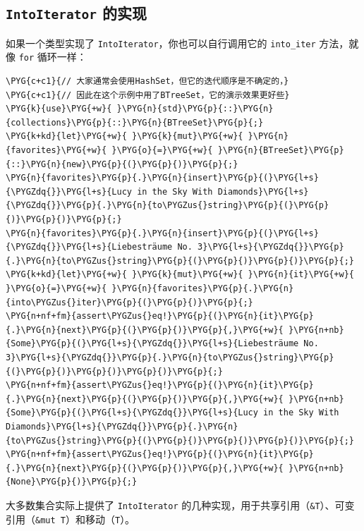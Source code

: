 \subsection{\texttt{IntoIterator} 的实现}

如果一个类型实现了 \texttt{IntoIterator}，你也可以自行调用它的 \texttt{into\_iter} 方法，就像 \texttt{for} 循环一样：

\begin{Verbatim}[commandchars=\\\{\},breaklines=true,breakanywhere=true,fontsize=\codefont,xleftmargin=17bp]
\PYG{c+c1}{// 大家通常会使用HashSet，但它的迭代顺序是不确定的，}
\PYG{c+c1}{// 因此在这个示例中用了BTreeSet，它的演示效果更好些}
\PYG{k}{use}\PYG{+w}{ }\PYG{n}{std}\PYG{p}{::}\PYG{n}{collections}\PYG{p}{::}\PYG{n}{BTreeSet}\PYG{p}{;}
\PYG{k+kd}{let}\PYG{+w}{ }\PYG{k}{mut}\PYG{+w}{ }\PYG{n}{favorites}\PYG{+w}{ }\PYG{o}{=}\PYG{+w}{ }\PYG{n}{BTreeSet}\PYG{p}{::}\PYG{n}{new}\PYG{p}{(}\PYG{p}{)}\PYG{p}{;}
\PYG{n}{favorites}\PYG{p}{.}\PYG{n}{insert}\PYG{p}{(}\PYG{l+s}{\PYGZdq{}}\PYG{l+s}{Lucy in the Sky With Diamonds}\PYG{l+s}{\PYGZdq{}}\PYG{p}{.}\PYG{n}{to\PYGZus{}string}\PYG{p}{(}\PYG{p}{)}\PYG{p}{)}\PYG{p}{;}
\PYG{n}{favorites}\PYG{p}{.}\PYG{n}{insert}\PYG{p}{(}\PYG{l+s}{\PYGZdq{}}\PYG{l+s}{Liebesträume No. 3}\PYG{l+s}{\PYGZdq{}}\PYG{p}{.}\PYG{n}{to\PYGZus{}string}\PYG{p}{(}\PYG{p}{)}\PYG{p}{)}\PYG{p}{;}
\PYG{k+kd}{let}\PYG{+w}{ }\PYG{k}{mut}\PYG{+w}{ }\PYG{n}{it}\PYG{+w}{ }\PYG{o}{=}\PYG{+w}{ }\PYG{n}{favorites}\PYG{p}{.}\PYG{n}{into\PYGZus{}iter}\PYG{p}{(}\PYG{p}{)}\PYG{p}{;}
\PYG{n+nf+fm}{assert\PYGZus{}eq!}\PYG{p}{(}\PYG{n}{it}\PYG{p}{.}\PYG{n}{next}\PYG{p}{(}\PYG{p}{)}\PYG{p}{,}\PYG{+w}{ }\PYG{n+nb}{Some}\PYG{p}{(}\PYG{l+s}{\PYGZdq{}}\PYG{l+s}{Liebesträume No. 3}\PYG{l+s}{\PYGZdq{}}\PYG{p}{.}\PYG{n}{to\PYGZus{}string}\PYG{p}{(}\PYG{p}{)}\PYG{p}{)}\PYG{p}{)}\PYG{p}{;}
\PYG{n+nf+fm}{assert\PYGZus{}eq!}\PYG{p}{(}\PYG{n}{it}\PYG{p}{.}\PYG{n}{next}\PYG{p}{(}\PYG{p}{)}\PYG{p}{,}\PYG{+w}{ }\PYG{n+nb}{Some}\PYG{p}{(}\PYG{l+s}{\PYGZdq{}}\PYG{l+s}{Lucy in the Sky With Diamonds}\PYG{l+s}{\PYGZdq{}}\PYG{p}{.}\PYG{n}{to\PYGZus{}string}\PYG{p}{(}\PYG{p}{)}\PYG{p}{)}\PYG{p}{)}\PYG{p}{;}
\PYG{n+nf+fm}{assert\PYGZus{}eq!}\PYG{p}{(}\PYG{n}{it}\PYG{p}{.}\PYG{n}{next}\PYG{p}{(}\PYG{p}{)}\PYG{p}{,}\PYG{+w}{ }\PYG{n+nb}{None}\PYG{p}{)}\PYG{p}{;}
\end{Verbatim}

大多数集合实际上提供了 \texttt{IntoIterator} 的几种实现，用于共享引用（\texttt{\&T}）、可变引用（\texttt{\&mut T}）和移动（\texttt{T}）。

